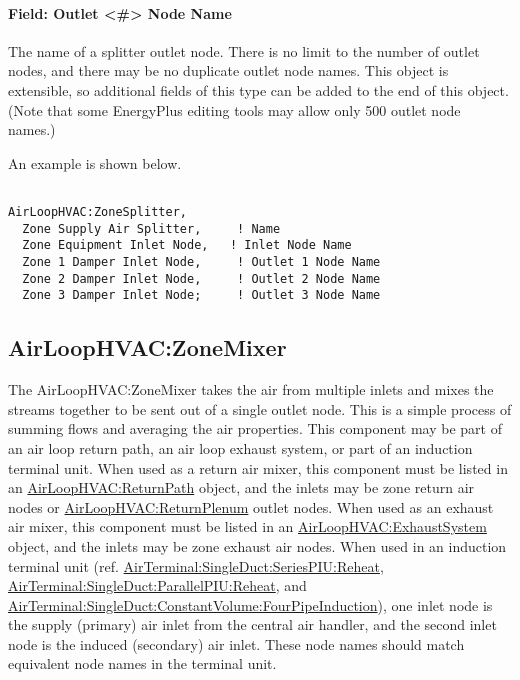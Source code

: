 \paragraph{Field: Outlet \textless{}\#\textgreater{} Node Name}

The name of a splitter outlet node. There is no limit to the number of outlet nodes, and there may be no duplicate outlet node names.  This object is extensible, so additional fields of this type can be added to the end of this object.  (Note that some EnergyPlus editing tools may allow only 500 outlet node names.)

An example is shown below.

\begin{lstlisting}

AirLoopHVAC:ZoneSplitter,
  Zone Supply Air Splitter,     ! Name
  Zone Equipment Inlet Node,   ! Inlet Node Name
  Zone 1 Damper Inlet Node,     ! Outlet 1 Node Name
  Zone 2 Damper Inlet Node,     ! Outlet 2 Node Name
  Zone 3 Damper Inlet Node;     ! Outlet 3 Node Name
\end{lstlisting}

\subsection{AirLoopHVAC:ZoneMixer}\label{airloophvaczonemixer}

The AirLoopHVAC:ZoneMixer takes the air from multiple inlets and mixes the streams together to be sent out of a single outlet node. This is a simple process of summing flows and averaging the air properties. This component may be part of an air loop return path, an air loop exhaust system, or part of an induction terminal unit. When used as a return air mixer, this component must be listed in an \hyperref[airloophvacreturnpath]{AirLoopHVAC:ReturnPath} object, and the inlets may be zone return air nodes or \hyperref[airloophvacreturnplenum]{AirLoopHVAC:ReturnPlenum} outlet nodes. When used as an exhaust air mixer, this component must be listed in an \hyperref[airloophvacexhaustsystem]{AirLoopHVAC:ExhaustSystem} object, and the inlets may be zone exhaust air nodes. When used in an induction terminal unit (ref. \hyperref[airterminalsingleductseriespiureheat]{AirTerminal:SingleDuct:SeriesPIU:Reheat}, \hyperref[airterminalsingleductparallelpiureheat]{AirTerminal:SingleDuct:ParallelPIU:Reheat}, and \hyperref[airterminalsingleductconstantvolumefourpipeinduction]{AirTerminal:SingleDuct:ConstantVolume:FourPipeInduction}), one inlet node is the supply (primary) air inlet from the central air handler, and the second inlet node is the induced (secondary) air inlet. These node names should match equivalent node names in the terminal unit.

